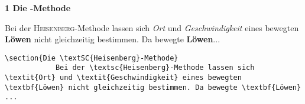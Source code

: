\begin{frame}[fragile]
	\Losung
	\begin{outputbox}
		{ \LARGE\textbf{1 Die -Methode}}
		
		Bei der \textsc{Heisenberg}-Methode lassen sich \textit{Ort} und \textit{Geschwindigkeit} eines bewegten \textbf{Löwen} nicht gleichzeitig bestimmen. Da bewegte \textbf{Löwen}...
	\end{outputbox}

	\Code
	\begin{lstlisting}[gobble=8]
		\section{Die \textSC{Heisenberg}-Methode}	
			Bei der \textsc{Heisenberg}-Methode lassen sich \textit{Ort} und \textit{Geschwindigkeit} eines bewegten \textbf{Löwen} nicht gleichzeitig bestimmen. Da bewegte \textbf{Löwen} ...
	\end{lstlisting}
\end{frame}
